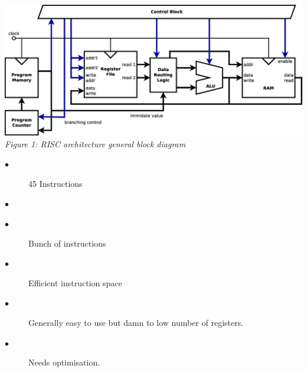 \documentclass[portrait,color=UCLmidgreen,margin=1.5cm,bannerheight=8cm,logoheight=2.5cm]{uclposter}
\begin{document}
\begin{multicols}{2}
	
\begin{tcolorbox}[title=RISC Architecture]
	
	\includegraphics[width=\linewidth]{../resources/risc.eps}
	\centering
	\textit{Figure 1: RISC architecture general block diagram}
	

	
	\begin{description}
		\item[$\bullet$] 45 Instructions
		\item[$\bullet$] 
	\end{description}


	
	\begin{description}
		\item[$\bullet$] Bunch of instructions
		\item[$\bullet$] Efficient instruction space
		\item[$\bullet$] Generally easy to use but damn to low number of registers.
		\item[$\bullet$] Needs optimisation.
	\end{description}
\end{tcolorbox}


\columnbreak



\begin{tcolorbox}[title=OISC Architecture]
	

\end{tcolorbox}
\end{multicols}
\end{document}
